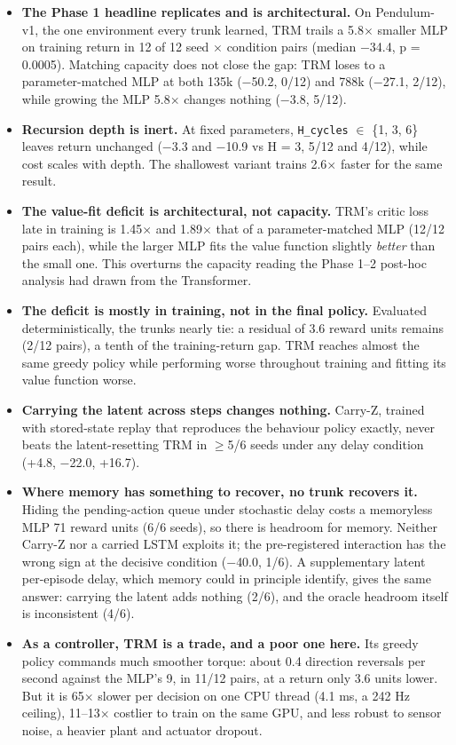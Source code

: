 \documentclass[11pt]{article}
\begin{document}
\begin{itemize}
\item \textbf{The Phase 1 headline replicates and is architectural.} On Pendulum-v1, the one environment every trunk learned, TRM trails a 5.8$\times$ smaller MLP on training return in 12 of 12 seed $\times$ condition pairs (median $-$34.4, p = 0.0005). Matching capacity does not close the gap: TRM loses to a parameter-matched MLP at both 135k ($-$50.2, 0/12) and 788k ($-$27.1, 2/12), while growing the MLP 5.8$\times$ changes nothing ($-$3.8, 5/12).
\item \textbf{Recursion depth is inert.} At fixed parameters, \texttt{H\_cycles} $\in$ \{1, 3, 6\} leaves return unchanged ($-$3.3 and $-$10.9 vs H = 3, 5/12 and 4/12), while cost scales with depth. The shallowest variant trains 2.6$\times$ faster for the same result.
\item \textbf{The value-fit deficit is architectural, not capacity.} TRM's critic loss late in training is 1.45$\times$ and 1.89$\times$ that of a parameter-matched MLP (12/12 pairs each), while the larger MLP fits the value function slightly \emph{better} than the small one. This overturns the capacity reading the Phase 1--2 post-hoc analysis had drawn from the Transformer.
\item \textbf{The deficit is mostly in training, not in the final policy.} Evaluated deterministically, the trunks nearly tie: a residual of 3.6 reward units remains (2/12 pairs), a tenth of the training-return gap. TRM reaches almost the same greedy policy while performing worse throughout training and fitting its value function worse.
\item \textbf{Carrying the latent across steps changes nothing.} Carry-Z, trained with stored-state replay that reproduces the behaviour policy exactly, never beats the latent-resetting TRM in $\geq$5/6 seeds under any delay condition (+4.8, $-$22.0, +16.7).
\item \textbf{Where memory has something to recover, no trunk recovers it.} Hiding the pending-action queue under stochastic delay costs a memoryless MLP 71 reward units (6/6 seeds), so there is headroom for memory. Neither Carry-Z nor a carried LSTM exploits it; the pre-registered interaction has the wrong sign at the decisive condition ($-$40.0, 1/6). A supplementary latent per-episode delay, which memory could in principle identify, gives the same answer: carrying the latent adds nothing (2/6), and the oracle headroom itself is inconsistent (4/6).
\item \textbf{As a controller, TRM is a trade, and a poor one here.} Its greedy policy commands much smoother torque: about 0.4 direction reversals per second against the MLP's 9, in 11/12 pairs, at a return only 3.6 units lower. But it is 65$\times$ slower per decision on one CPU thread (4.1 ms, a 242 Hz ceiling), 11--13$\times$ costlier to train on the same GPU, and less robust to sensor noise, a heavier plant and actuator dropout.
\end{itemize}
\end{document}
